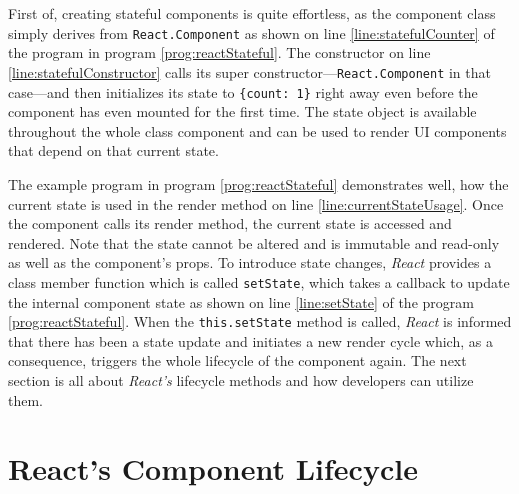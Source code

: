 First of, creating stateful components is quite effortless, as the component class simply derives from \texttt{React.Component} as shown on line \ref{line:statefulCounter} of the program in program \ref{prog:reactStateful}. The constructor on line \ref{line:statefulConstructor} calls its super constructor---\texttt{React.Component} in that case---and then initializes its state to \texttt{\{count: 1\}} right away even before the component has even mounted for the first time. The state object is available throughout the whole class component and can be used to render UI components that depend on that current state.

The example program in program \ref{prog:reactStateful} demonstrates well, how the current state is used in the render method on line \ref{line:currentStateUsage}. Once the component calls its render method, the current state is accessed and rendered. Note that the state cannot be altered and is immutable and read-only as well as the component's props. To introduce state changes, \emph{React} provides a class member function which is called \texttt{setState}, which takes a callback to update the internal component state as shown on line \ref{line:setState} of the program \ref{prog:reactStateful}. When the \texttt{this.setState} method is called, \emph{React} is informed that there has been a state update and initiates a new render cycle which, as a consequence, triggers the whole lifecycle of the component again. The next section is all about \emph{React's} lifecycle methods and how developers can utilize them.



\section{React's Component Lifecycle}


